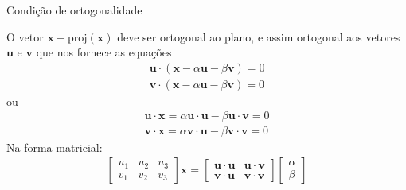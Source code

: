 \documentclass{beamer}
\begin{document}
\begin{frame}{Condição de ortogonalidade}

  O vetor $\mathbf{x} - \text{proj}(\mathbf{x})$ deve ser ortogonal ao 
  plano, e assim ortogonal aos vetores $\mathbf{u}$ e $\mathbf{v}$ que nos 
  fornece as equações
\begin{gather*}
  \mathbf{u}\cdot (\mathbf{x}-\alpha\mathbf{u} -\beta\mathbf{v})=0 \\
  \mathbf{v}\cdot (\mathbf{x}-\alpha\mathbf{u} -\beta\mathbf{v}) =0
\end{gather*}
ou
\begin{gather*}
  \mathbf{u}\cdot \mathbf{x}=\alpha\mathbf{u}\cdot\mathbf{u} -\beta\mathbf{u}\cdot\mathbf{v}=0 \\
  \mathbf{v}\cdot \mathbf{x}=\alpha\mathbf{v}\cdot\mathbf{u} -\beta\mathbf{v}\cdot\mathbf{v} =0
\end{gather*}
  Na forma matricial:
  \begin{gather*} \begin{bmatrix}
    u_1 & u_2 & u_3 \\
    v_1 & v_2 & v_3 
  \end{bmatrix} \mathbf{x} = \begin{bmatrix}
    \mathbf{u}\cdot\mathbf{u} & \mathbf{u}\cdot\mathbf{v} \\
    \mathbf{v}\cdot\mathbf{u} & \mathbf{v}\cdot\mathbf{v}
  \end{bmatrix}\begin{bmatrix}
    \alpha \\ \beta
  \end{bmatrix} \end{gather*}
\end{frame}
\end{document}

